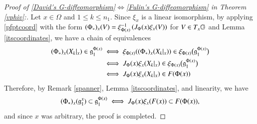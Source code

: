 \documentclass[leqno]{amsart}
\begin{document}
	
	\begin{proof}[Proof of \eqref{David's G-diffeomorphism}$\Longleftrightarrow$\eqref{Fulin's G-diffeomorphism} in Theorem \ref{vphiv}:]
		
		Let $x\in\Omega$ and $1\leq k\leq n_1$. Since $\xi_x$ is a linear isomorphism, by applying \eqref{pfptcoord} with the form $(\Phi_{*})_{x}(V)=\xi_{\Phi(x)}^{-1}\left(J_{\Phi}(x)\xi_{x}(V)\right)$ for $V\in T_{x}\mathbb{G}$ and Lemma \ref{itscoordinates}, we have a chain of equivalences
		\begin{align*}
			(\Phi_{*})_{x} (X_k|_x)\in \mathfrak{g}_1^{\Phi(x)}&\iff\xi_{\Phi(x)}((\Phi_{*})_{x} (X_k|_x))\in \xi_{\Phi(x)}\big(\mathfrak{g}_1^{\Phi(x)}\big)\\
			&\iff J_\Phi(x)\xi_x(X_k|_x)\in  \xi_{\Phi(x)}\big(\mathfrak{g}_1^{\Phi(x)}\big)\\
			&\iff J_\Phi(x)\xi_x(X_k|_x)\in  F(\Phi(x))
		\end{align*}
		Therefore, by Remark \ref{spanner}, Lemma \ref{itscoordinates}, and linearity, we have
		$$(\Phi_{*})_{x} (\mathfrak{g}_1^x)\subset \mathfrak{g}_1^{\Phi(x)}\iff J_\Phi(x)\xi_x(F(x))\subset F(\Phi(x)),$$
		and since $x$ was arbitrary, the proof is completed.
	\end{proof}
	
	 
	
\end{document}
